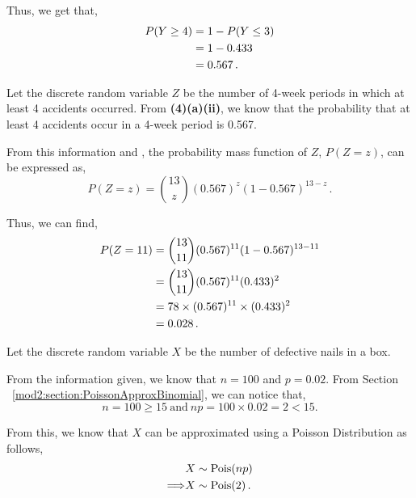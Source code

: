\begin{subquestions}
\begin{subsubquestions}
Thus, we get that,
\begin{align}
	P(Y \geq 4) & = 1 - P(Y \leq 3) \nonumber \\
	            & = 1 - 0.433 \nonumber \\
	            & = 0.567 \,.
\end{align}


\subsubquestion

Let the discrete random variable $Z$ be the number of 4-week periods in which at least 4 accidents occurred. From \textbf{(4)(a)(ii)}, we know that the probability that at least 4 accidents occur in a 4-week period is 0.567.

From this information and , the probability mass function of $Z$, $P(Z=z)$, can be expressed as,
\begin{equation}
		P(Z = z) = { 13 \choose z} (0.567)^z  (1-0.567)^{13-z} \,.
\end{equation}

Thus, we can find,
\begin{align}
	P(Z = 11) & = { 13 \choose 11} (0.567)^{11}  (1-0.567)^{13-11} \nonumber \\
	          & = { 13 \choose 11} (0.567)^{11}  (0.433)^{2} \nonumber \\
	          & = 78 \times (0.567)^{11} \times (0.433)^{2} \nonumber \\
	          & = 0.028 \,.
\end{align}

\end{subsubquestions}


\subquestion

Let the discrete random variable $X$ be the number of defective nails in a box.

From the information given, we know that $n=100$ and $p=0.02$. From Section ~\ref{mod2:section:PoissonApproxBinomial}, we can notice that,
\begin{equation}
	n=100 \geq 15 ~\text{and} ~np= 100 \times 0.02=2<15.
\end{equation}  

From this, we know that $X$ can be approximated using a Poisson Distribution as follows,
\begin{align}
	& X \sim \text{Pois}(np) \nonumber \\
	\Longrightarrow & X \sim \text{Pois}(2) \,.
\end{align}


\end{subquestions}
